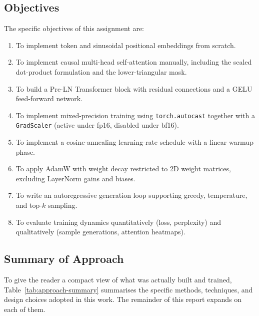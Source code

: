 \subsection{Objectives}
The specific objectives of this assignment are:
\begin{enumerate}
    \item To implement token and sinusoidal positional embeddings from
          scratch.
    \item To implement causal multi-head self-attention manually, including
          the scaled dot-product formulation and the lower-triangular mask.
    \item To build a Pre-LN Transformer block with residual connections and
          a GELU feed-forward network.
    \item To implement mixed-precision training using
          \texttt{torch.autocast} together with a
          \texttt{GradScaler} (active under fp16, disabled under bf16).
    \item To implement a cosine-annealing learning-rate schedule with a
          linear warmup phase.
    \item To apply AdamW with weight decay restricted to 2D weight matrices,
          excluding LayerNorm gains and biases.
    \item To write an autoregressive generation loop supporting greedy,
          temperature, and top-$k$ sampling.
    \item To evaluate training dynamics quantitatively (loss, perplexity)
          and qualitatively (sample generations, attention heatmaps).
\end{enumerate}

\subsection{Summary of Approach}
\label{subsec:approach}

To give the reader a compact view of what was actually built and trained,
Table~\ref{tab:approach-summary} summarises the specific methods,
techniques, and design choices adopted in this work. The remainder of
this report expands on each of them.

